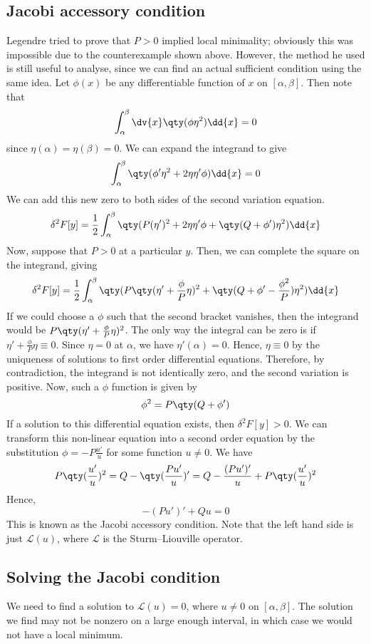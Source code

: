 \subsection{Jacobi accessory condition}
Legendre tried to prove that \( P > 0 \) implied local minimality; obviously this was impossible due to the counterexample shown above.
However, the method he used is still useful to analyse, since we can find an actual sufficient condition using the same idea.
Let \( \phi(x) \) be any differentiable function of \( x \) on \( [\alpha, \beta] \).
Then note that
\[
	\int_\alpha^\beta \dv{x} \qty( \phi \eta^2 ) \dd{x} = 0
\]
since \( \eta(\alpha) = \eta(\beta) = 0 \).
We can expand the integrand to give
\[
	\int_\alpha^\beta \qty( \phi' \eta^2 + 2 \eta \eta' \phi ) \dd{x} = 0
\]
We can add this new zero to both sides of the second variation equation.
\[
	\delta^2 F[y] = \frac{1}{2} \int_\alpha^\beta \qty( P(\eta')^2 + 2 \eta \eta' \phi + \qty(Q + \phi') \eta^2 ) \dd{x}
\]
Now, suppose that \( P > 0 \) at a particular \( y \).
Then, we can complete the square on the integrand, giving
\[
	\delta^2 F[y] = \frac{1}{2} \int_\alpha^\beta \qty( P\qty(\eta' + \frac{\phi}{P} \eta)^2 + \qty(Q + \phi' - \frac{\phi^2}{P}) \eta^2 ) \dd{x}
\]
If we could choose a \( \phi \) such that the second bracket vanishes, then the integrand would be \( P\qty(\eta' + \frac{\phi}{P} \eta)^2 \).
The only way the integral can be zero is if \( \eta' + \frac{\phi}{P} \eta \equiv 0 \).
Since \( \eta = 0 \) at \( \alpha \), we have \( \eta'(\alpha) = 0 \).
Hence, \( \eta \equiv 0 \) by the uniqueness of solutions to first order differential equations.
Therefore, by contradiction, the integrand is not identically zero, and the second variation is positive.
Now, such a \( \phi \) function is given by
\[
	\phi^2 = P\qty(Q + \phi')
\]
If a solution to this differential equation exists, then \( \delta^2 F[y] > 0 \).
We can transform this non-linear equation into a second order equation by the substitution \( \phi = -P \frac{u'}{u} \) for some function \( u \neq 0 \).
We have
\[
	P \qty(\frac{u'}{u})^2 = Q - \qty(\frac{Pu'}{u})' = Q - \frac{(Pu')'}{u} + P \qty(\frac{u'}{u})^2
\]
Hence,
\[
	-(Pu')' + Qu = 0
\]
This is known as the Jacobi accessory condition.
Note that the left hand side is just \( \mathcal L(u) \), where \( \mathcal L \) is the Sturm--Liouville operator.

\subsection{Solving the Jacobi condition}
We need to find a solution to \( \mathcal L(u) = 0 \), where \( u \neq 0 \) on \( [\alpha, \beta] \).
The solution we find may not be nonzero on a large enough interval, in which case we would not have a local minimum.

